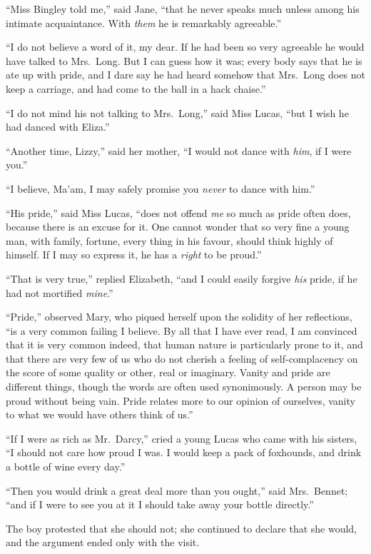 “Miss Bingley told me,” said Jane, “that he never
speaks much unless among his intimate acquaintance.
With \textit{them} he is remarkably agreeable.”

“I do not believe a word of it, my dear. If he had been
so very agreeable he would have talked to Mrs.\ Long.
But I can guess how it was; every body says that he is
ate up with pride, and I dare say he had heard somehow
that Mrs.\ Long does not keep a carriage, and had come
to the ball in a hack chaise.”

“I do not mind his not talking to Mrs.\ Long,” said
Miss Lucas, “but I wish he had danced with Eliza.”

“Another time, Lizzy,” said her mother, “I would not
dance with \textit{him}, if I were you.”

“I believe, Ma’am, I may safely promise you \textit{never} to
dance with him.”

“His pride,” said Miss Lucas, “does not offend \textit{me} so
much as pride often does, because there is an excuse for it.
One cannot wonder that so very fine a young man, with
family, fortune, every thing in his favour, should think
highly of himself. If I may so express it, he has a \textit{right}
to be proud.”

“That is very true,” replied Elizabeth, “and I could
easily forgive \textit{his} pride, if he had not mortified \textit{mine}.”

“Pride,” observed Mary, who piqued herself upon the
solidity of her reflections, “is a very common failing I
believe. By all that I have ever read, I am convinced
that it is very common indeed, that human nature is
particularly prone to it, and that there are very few of
us who do not cherish a feeling of self-complacency on
the score of some quality or other, real or imaginary.
Vanity and pride are different things, though the words
are often used synonimously. A person may be proud
without being vain. Pride relates more to our opinion
of ourselves, vanity to what we would have others think
of us.”

“If I were as rich as Mr.\ Darcy,” cried a young Lucas
who came with his sisters, “I should not care how proud
I was. I would keep a pack of foxhounds, and drink
a bottle of wine every day.”

“Then you would drink a great deal more than you
ought,” said Mrs.\ Bennet; “and if I were to see you at
it I should take away your bottle directly.”

The boy protested that she should not; she continued
to declare that she would, and the argument ended only
with the visit.

